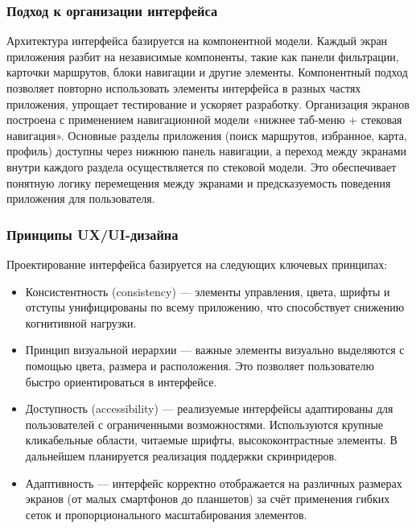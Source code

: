 \subsubsection*{Подход к организации интерфейса}
Архитектура интерфейса базируется на компонентной модели. Каждый экран приложения разбит на независимые компоненты, такие как панели фильтрации, карточки маршрутов, блоки навигации и другие элементы. Компонентный подход позволяет повторно использовать элементы интерфейса в разных частях приложения, упрощает тестирование и ускоряет разработку.
Организация экранов построена с применением навигационной модели «нижнее таб-меню + стековая навигация». Основные разделы приложения (поиск маршрутов, избранное, карта, профиль) доступны через нижнюю панель навигации, а переход между экранами внутри каждого раздела осуществляется по стековой модели. Это обеспечивает понятную логику перемещения между экранами и предсказуемость поведения приложения для пользователя.

\subsubsection*{Принципы UX/UI-дизайна}
Проектирование интерфейса базируется на следующих ключевых принципах:
\begin{itemize}
    \item Консистентность (consistency) — элементы управления, цвета, шрифты и отступы унифицированы по всему приложению, что способствует снижению когнитивной нагрузки.
    \item Принцип визуальной иерархии — важные элементы визуально выделяются с помощью цвета, размера и расположения. Это позволяет пользователю быстро ориентироваться в интерфейсе.
    \item Доступность (accessibility) — реализуемые интерфейсы адаптированы для пользователей с ограниченными возможностями. Используются крупные кликабельные области, читаемые шрифты, высококонтрастные элементы. В дальнейшем планируется реализация поддержки скринридеров.
    \item Адаптивность — интерфейс корректно отображается на различных размерах экранов (от малых смартфонов до планшетов) за счёт применения гибких сеток и пропорционального масштабирования элементов.
\end{itemize}

